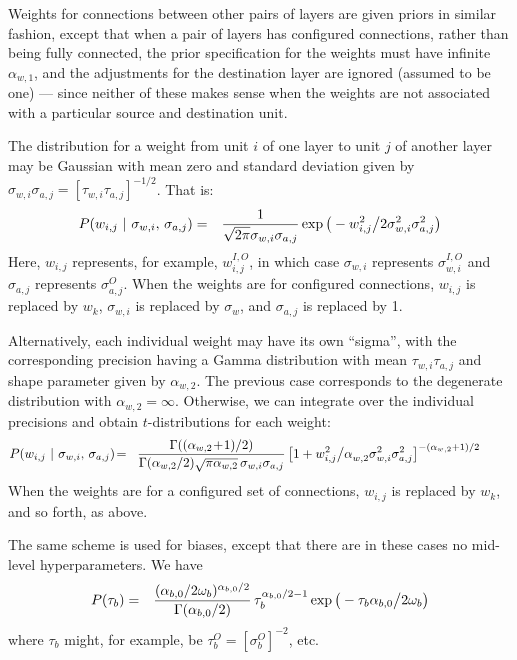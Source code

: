 \documentclass{report}[11pt]
\def\beq{\begin{eqnarray}}
\def\eeq{\end{eqnarray}}
\begin{document}
Weights for connections between other pairs of layers are given priors
in similar fashion, except that when a pair of layers has configured
connections, rather than being fully connected, the prior
specification for the weights must have infinite $\alpha_{w,1}$, and
the adjustments for the destination layer are ignored (assumed to be
one) --- since neither of these makes sense when the weights are not
associated with a particular source and destination unit.

The distribution for a weight from unit $i$ of one layer to unit $j$ of
another layer may be Gaussian with mean zero and standard deviation given 
by $\sigma_{w,i}\sigma_{a,j} = [\tau_{w,i}\tau_{a,j}]^{-1/2}$. That is:\beq
  P(w_{i,j}\ |\ \sigma_{w,i},\,\sigma_{a,j}) & = &
    {1 \over \sqrt{2\pi} \sigma_{w,i}\sigma_{a,j}} 
    \exp \big( - w_{i,j}^2 \big/ 2\sigma_{w,i}^2\sigma_{a,j}^2 \big)
\label{priorwg}\eeq%
Here, $w_{i,j}$ represents, for example, $w^{I,O}_{i,j}$, in which case
$\sigma_{w,i}$ represents $\sigma^{I,O}_{w,i}$ and $\sigma_{a,j}$ represents
$\sigma^O_{a,j}$.  When the weights are for configured connections, $w_{i,j}$
is replaced by $w_k$, $\sigma_{w,i}$ is replaced by $\sigma_w$, and
$\sigma_{a,j}$ is replaced by 1.

Alternatively, each individual weight may have its own ``sigma'', with
the corresponding precision having a Gamma distribution with mean
$\tau_{w,i}\tau_{a,j}$ and shape parameter given by $\alpha_{w,2}$.  The
previous case corresponds to the degenerate distribution with
$\alpha_{w,2} = \infty$.  Otherwise, we can integrate over the individual
precisions and obtain $t$-distributions for each weight:\beq
  P(w_{i,j}\ |\ \sigma_{w,i},\,\sigma_{a,j}) & \!=\! &
    {\Gamma((\alpha_{w,2}\!+\!1)/2) \over 
     \Gamma(\alpha_{w,2}/2) \sqrt{\pi\alpha_{w,2}}\, \sigma_{w,i}\sigma_{a,j}}\,
     \big[ 1 + w_{i,j}^2 \big/ \alpha_{w,2}^{\ }\sigma_{w,i}^2\sigma_{a,j}^2 
     \big]^{ -(\alpha_{w,2}+1)/2}\ \ \ \ \ \ \
\label{priorwt}\eeq
When the weights are for a configured set of connections, $w_{i,j}$ is
replaced by $w_k$, and so forth, as above.

The same scheme is used for biases, except that there are in
these cases no mid-level hyperparameters.  We have \beq
  P(\tau_b)
   & = & {(\alpha_{b,0}/2\omega_b)^{\alpha_{b,0}/2} 
          \over \Gamma(\alpha_{b,0}/2)}\,
         \tau_b^{\alpha_{b,0}/2-1}
         \exp \big(-\tau_b \alpha_{b,0} \big/ 2 \omega_b \big) 
\eeq%
where $\tau_b$ might, for example, be $\tau^{O}_b = [\sigma^{O}_b]^{-2}$, etc.
\end{document}
